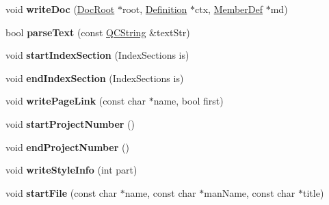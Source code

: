 \begin{DoxyCompactItemize}
\item 
\hypertarget{class_output_list_ac54c840e6ab878d410506981d9410392}{void {\bfseries write\-Doc} (\hyperlink{class_doc_root}{Doc\-Root} $\ast$root, \hyperlink{class_definition}{Definition} $\ast$ctx, \hyperlink{class_member_def}{Member\-Def} $\ast$md)}\label{class_output_list_ac54c840e6ab878d410506981d9410392}

\item 
\hypertarget{class_output_list_af5eeeade05278369878897381f462a59}{bool {\bfseries parse\-Text} (const \hyperlink{class_q_c_string}{Q\-C\-String} \&text\-Str)}\label{class_output_list_af5eeeade05278369878897381f462a59}

\item 
\hypertarget{class_output_list_a6622e00de24d36580d74ec8c3941dc01}{void {\bfseries start\-Index\-Section} (Index\-Sections is)}\label{class_output_list_a6622e00de24d36580d74ec8c3941dc01}

\item 
\hypertarget{class_output_list_a05d47fdb387791ffa5aba68a8cd7d64c}{void {\bfseries end\-Index\-Section} (Index\-Sections is)}\label{class_output_list_a05d47fdb387791ffa5aba68a8cd7d64c}

\item 
\hypertarget{class_output_list_a3b1a0594e6edabdfc1ef16c721a521a4}{void {\bfseries write\-Page\-Link} (const char $\ast$name, bool first)}\label{class_output_list_a3b1a0594e6edabdfc1ef16c721a521a4}

\item 
\hypertarget{class_output_list_ab49b9a957bcd7cdd43e97cf46ee3fd5b}{void {\bfseries start\-Project\-Number} ()}\label{class_output_list_ab49b9a957bcd7cdd43e97cf46ee3fd5b}

\item 
\hypertarget{class_output_list_adb778208eb7fefd771008cfeab951888}{void {\bfseries end\-Project\-Number} ()}\label{class_output_list_adb778208eb7fefd771008cfeab951888}

\item 
\hypertarget{class_output_list_ad3736313034c23173b4eac01d95b43d3}{void {\bfseries write\-Style\-Info} (int part)}\label{class_output_list_ad3736313034c23173b4eac01d95b43d3}

\item 
\hypertarget{class_output_list_a642331f37add1aa818a86124a5fe4723}{void {\bfseries start\-File} (const char $\ast$name, const char $\ast$man\-Name, const char $\ast$title)}\label{class_output_list_a642331f37add1aa818a86124a5fe4723}


\end{DoxyCompactItemize}
